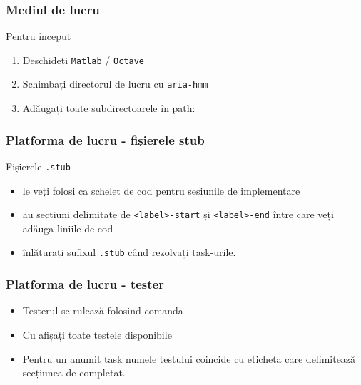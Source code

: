 \begin{frame}
  \frametitle{Mediul de lucru}
Pentru început
  \begin{enumerate}
  \item Deschideți \texttt{Matlab} / \texttt{Octave}
  \item Schimbați directorul de lucru cu \texttt{aria-hmm}
  \item Adăugați toate subdirectoarele în path:\\
  \end{enumerate}
\end{frame}

\begin{frame}
  \frametitle{Platforma de lucru - fișierele stub}
  Fișierele \texttt{.stub}
  \begin{itemize}
  \item le veți folosi ca schelet de cod pentru sesiunile de implementare
  \item au sectiuni delimitate de \texttt{<label>-start} și \texttt{<label>-end}
    între care veți adăuga liniile de cod
  \item înlăturați sufixul \texttt{.stub} când rezolvați task-urile.
  \end{itemize}\vspace*{-1em}%
  
\end{frame}

\begin{frame}
  \frametitle{Platforma de lucru - tester}
  \begin{itemize}
    \item Testerul se rulează folosind comanda 
      
    \item Cu  afișați toate testele disponibile
    \item Pentru un anumit task numele testului coincide cu eticheta care delimitează secțiunea de completat.
  \end{itemize}
\end{frame}